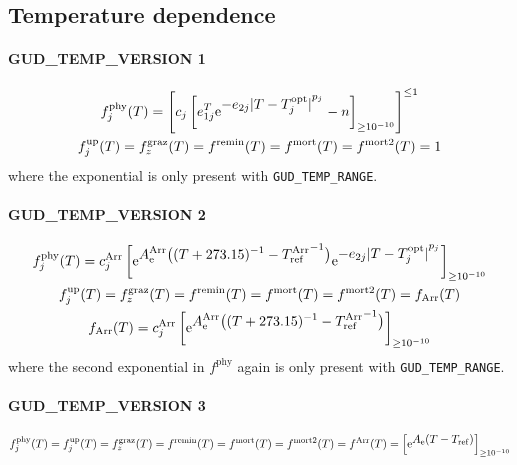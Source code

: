 \documentclass[11pt,letterpaper,english]{article}
\let\ds=\displaystyle
\def\|#1|{\operatorname{#1}}
\newcommand{\ee}{\mathrm{e}}
\newcommand{\graz}{{\text{graz}}}
\newcommand{\phy}{{\text{phy}}}
\newcommand{\up}{{\text{up}}}
\newcommand{\remin}{{\text{remin}}}
\begin{document}
\subsection{Temperature dependence}

\paragraph{GUD\_TEMP\_VERSION 1}
\begin{gather*}
  f^\phy_j(T) = \left[ c_j \left[ e_{1 j}^T
      \ee^{\ds -e_{2 j} {| T - T^{\|opt|}_j |}^{p_j}}  %
    - n \right]_{\ge\num{E-10}}
    \right]^{\le 1}
\\
  f^{\up}_j(T) =
  f^\graz_z(T) =
  f^\remin(T) =
  f^{\|mort|}(T) =
  f^{\|mort2|}(T) =
  1
\end{gather*}
where the exponential is only present with \verb|GUD_TEMP_RANGE|.

\paragraph{GUD\_TEMP\_VERSION 2}
\begin{gather*}
  f^\phy_j(T) = c^{\|Arr|}_j \left[
      \ee^{\ds A^{\|Arr|}_{\|e|}
           \bigl( (T+273.15)^{-1} - {T^{\|Arr|}_{\|ref|}}^{-1} \bigr)}
      \ee^{\ds -e_{2 j} {| T - T^{\|opt|}_j |}^{p_j}}  %
    \right]_{\ge\num{E-10}}
\\
  f^{\up}_j(T) =
  f^\graz_z(T) =
  f^\remin(T) =
  f^{\|mort|}(T) =
  f^{\|mort2|}(T) =
  f_{\|Arr|}(T)
\\
  f_{\|Arr|}(T) = c^{\|Arr|}_j \left[
      \ee^{\ds A^{\|Arr|}_{\|e|}
           \bigl( (T+273.15)^{-1} - {T^{\|Arr|}_{\|ref|}}^{-1} \bigr)}
    \right]_{\ge\num{E-10}}
\end{gather*}
where the second exponential in $f^\phy$ again is only present with \verb|GUD_TEMP_RANGE|.

\paragraph{GUD\_TEMP\_VERSION 3}
\begin{gather*}
  f^\phy_j(T) =
  f^{\up}_j(T) =
  f^\graz_z(T) =
  f^\remin(T) =
  f^{\|mort|}(T) =
  f^{\|mort2|}(T) =
  f^{\|Arr|}(T) =
  \left[ \ee^{\ds A_{\|e|} (T - T_{\|ref|})} \right]_{\ge\num{E-10}}
\end{gather*}
\end{document}
